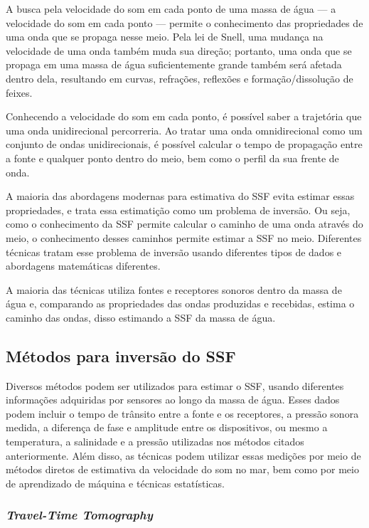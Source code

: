 A busca pela velocidade do som em cada ponto de uma massa de água --- a velocidade do som em cada ponto --- permite o conhecimento das propriedades de uma onda que se propaga nesse meio. Pela lei de Snell, uma mudança na velocidade de uma onda também muda sua direção; portanto, uma onda que se propaga em uma massa de água suficientemente grande também será afetada dentro dela, resultando em curvas, refrações, reflexões e formação/dissolução de feixes.

Conhecendo a velocidade do som em cada ponto, é possível saber a trajetória que uma onda unidirecional percorreria. Ao tratar uma onda omnidirecional como um conjunto de ondas unidirecionais, é possível calcular o tempo de propagação entre a fonte e qualquer ponto dentro do meio, bem como o perfil da sua frente de onda.

A maioria das abordagens modernas para estimativa do SSF evita estimar essas propriedades, e trata essa estimatição como um problema de inversão. Ou seja, como o conhecimento da SSF permite calcular o caminho de uma onda através do meio, o conhecimento desses caminhos permite estimar a SSF no meio. Diferentes técnicas tratam esse problema de inversão usando diferentes tipos de dados e abordagens matemáticas diferentes.

A maioria das técnicas utiliza fontes e receptores sonoros dentro da massa de água e, comparando as propriedades das ondas produzidas e recebidas, estima o caminho das ondas, disso estimando a SSF da massa de água.

\subsection{Métodos para inversão do SSF}

Diversos métodos podem ser utilizados para estimar o SSF, usando diferentes informações adquiridas por sensores ao longo da massa de água. Esses dados podem incluir o tempo de trânsito entre a fonte e os receptores, a pressão sonora medida, a diferença de fase e amplitude entre os dispositivos, ou mesmo a temperatura, a salinidade e a pressão utilizadas nos métodos citados anteriormente. Além disso, as técnicas podem utilizar essas medições por meio de métodos diretos de estimativa da velocidade do som no mar, bem como por meio de aprendizado de máquina e técnicas estatísticas.

\subsubsection{\textit{Travel-Time Tomography}}

